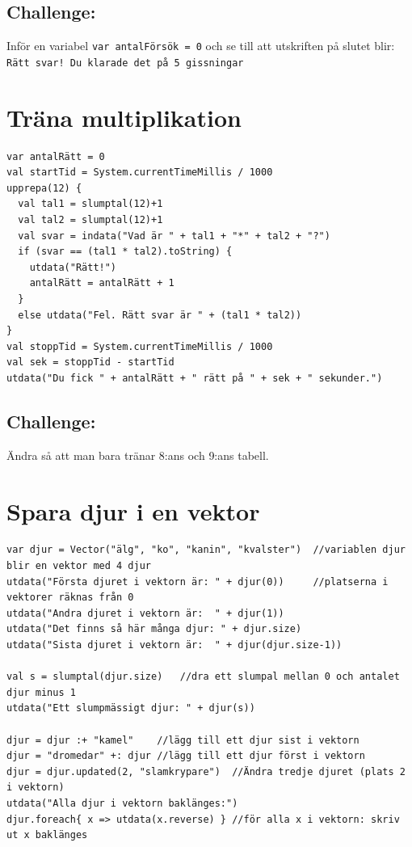 \section*{\color{BrickRed}Challenge:}
Inför en variabel \lstinline{var antalFörsök = 0} och se till att utskriften på slutet blir:\\
\lstinline{Rätt svar! Du klarade det på 5 gissningar}
\chapter{Träna multiplikation}
\begin{lstlisting}[basicstyle={\ttfamily\fontsize{16}{19}\selectfont},numbers=none]
var antalRätt = 0
val startTid = System.currentTimeMillis / 1000
upprepa(12) {
  val tal1 = slumptal(12)+1
  val tal2 = slumptal(12)+1
  val svar = indata("Vad är " + tal1 + "*" + tal2 + "?")
  if (svar == (tal1 * tal2).toString) {
    utdata("Rätt!")
    antalRätt = antalRätt + 1
  }
  else utdata("Fel. Rätt svar är " + (tal1 * tal2))
}
val stoppTid = System.currentTimeMillis / 1000
val sek = stoppTid - startTid
utdata("Du fick " + antalRätt + " rätt på " + sek + " sekunder.")
\end{lstlisting}
        
\section*{\color{BrickRed}Challenge:}
Ändra så att man bara tränar 8:ans och 9:ans tabell.
\chapter{Spara djur i en vektor}
\begin{lstlisting}[basicstyle={\ttfamily\fontsize{14}{17}\selectfont},numbers=none]
var djur = Vector("älg", "ko", "kanin", "kvalster")  //variablen djur blir en vektor med 4 djur
utdata("Första djuret i vektorn är: " + djur(0))     //platserna i vektorer räknas från 0
utdata("Andra djuret i vektorn är:  " + djur(1))
utdata("Det finns så här många djur: " + djur.size)
utdata("Sista djuret i vektorn är:  " + djur(djur.size-1))

val s = slumptal(djur.size)   //dra ett slumpal mellan 0 och antalet djur minus 1
utdata("Ett slumpmässigt djur: " + djur(s))

djur = djur :+ "kamel"    //lägg till ett djur sist i vektorn
djur = "dromedar" +: djur //lägg till ett djur först i vektorn
djur = djur.updated(2, "slamkrypare")  //Ändra tredje djuret (plats 2 i vektorn)
utdata("Alla djur i vektorn baklänges:")
djur.foreach{ x => utdata(x.reverse) } //för alla x i vektorn: skriv ut x baklänges
\end{lstlisting}
        
